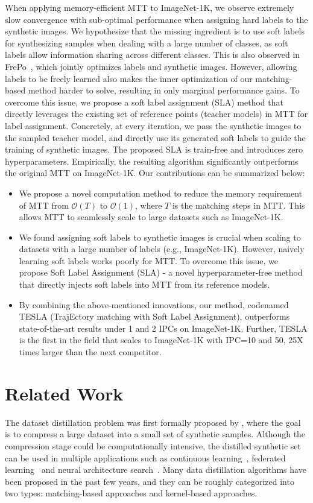 \documentclass[10pt,twocolumn,letterpaper]{article}
\begin{document}
When applying memory-efficient MTT to ImageNet-1K, we observe extremely slow convergence with sub-optimal performance when assigning hard labels to the synthetic images.
We hypothesize that the missing ingredient is to use soft labels for synthesizing samples when dealing with a large number of classes, as soft labels allow information sharing across different classes.
This is also observed in FrePo~\cite{zhou2022dataset}, which jointly optimizes labels and synthetic images.
However, allowing labels to be freely learned also makes the inner optimization of our matching-based method harder to solve, resulting in only marginal performance gains.
To overcome this issue, we propose a soft label assignment (SLA) method that directly leverages the existing set of reference points (teacher models) in MTT for label assignment.
Concretely, at every iteration, we pass the synthetic images to the sampled teacher model, and directly use its generated soft labels to guide the training of synthetic images.
The proposed SLA is train-free and introduces zero hyperparameters. Empirically, the resulting algorithm significantly outperforms the original MTT on ImageNet-1K. Our contributions can be summarized below: 
\begin{itemize}
\item We propose a novel computation method to reduce the memory requirement of MTT from $\mathcal{O}(T)$ to $\mathcal{O}(1)$, where $T$ is the matching steps in MTT. This allows MTT to seamlessly scale to large datasets such as ImageNet-1K. 
\item We found assigning soft labels to synthetic images is crucial when scaling to datasets with a large number of labels (e.g., ImageNet-1K). However, naively learning soft labels works poorly for MTT. To overcome this issue, we propose Soft Label Assignment (SLA) - a novel hyperparameter-free method that directly injects soft labels into MTT from its reference models.
\item By combining the above-mentioned innovations, our method, codenamed TESLA (TrajEctory matching with Soft Label Assignment), outperforms state-of-the-art results under 1 and 2 IPCs on ImageNet-1K. Further, TESLA is the first in the field that scales to ImageNet-1K with IPC=10 and 50, 25X times larger than the next competitor.
\end{itemize}

\section{Related Work}
The dataset distillation problem was first formally proposed by \cite{wang2018dataset}, where the goal is to compress a large dataset into a small set of synthetic samples. Although the compression stage could be computationally intensive, the distilled synthetic set can be used in multiple applications such as continuous learning~\cite{wang2018dataset,zhaodc}, federated learning~\cite{zhou2020distilled,xiong2022FedDM} and neural architecture search~\cite{zhaodsa, wang2021rethinking}. Many data distillation algorithms have been proposed in the past few years, and they can be roughly categorized into two types: matching-based approaches and kernel-based approaches. 
\end{document}
